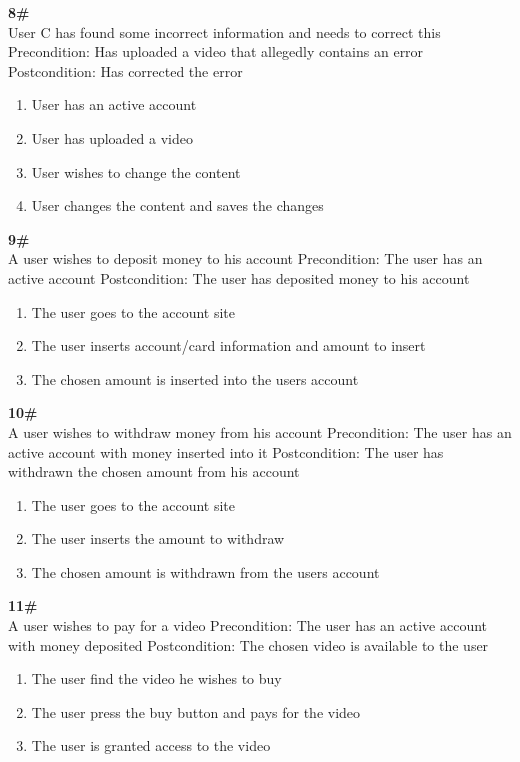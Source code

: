 \vspace{10pt}
\textbf{8\#}\\
User C has found some incorrect information and needs to correct this
Precondition: Has uploaded a video that allegedly contains an error
Postcondition: Has corrected the error
\begin{enumerate}
\item User has an active account
\item User has uploaded a video
\item User wishes to change the content
\item User changes the content and saves the changes
\end{enumerate}
	

\vspace{10pt}
\textbf{9\#}\\
A user wishes to deposit money to his account
Precondition: The user has an active account
Postcondition: The user has deposited money to his account
\begin{enumerate}
\item The user goes to the account site
\item The user inserts account/card information and amount to insert
\item The chosen amount is inserted into the users account
\end{enumerate}
	


\vspace{10pt}
\textbf{10\#}\\
A user wishes to withdraw money from his account
Precondition: The user has an active account with money inserted into it
Postcondition: The user has withdrawn the chosen amount from his account
\begin{enumerate}
\item The user goes to the account site
\item The user inserts the amount to withdraw
\item The chosen amount is withdrawn from the users account
\end{enumerate}
	
\vspace{10pt}
\textbf{11\#}\\
A user wishes to pay for a video
Precondition: The user has an active account with money deposited
Postcondition: The chosen video is available to the user
\begin{enumerate}
\item The user find the video he wishes to buy
\item The user press the buy button and pays for the video
\item The user is granted access to the video
\end{enumerate}
\newpage

